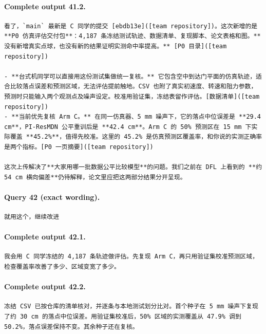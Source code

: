 \documentclass[UTF8,10pt]{ctexart}
\begin{document}
\paragraph{Complete output 41.2.}
\begin{Verbatim}[breaklines=true,breakanywhere=true,fontsize=\scriptsize,frame=single,framesep=2pt]
看了，`main` 最新是 C 同学的提交 [ebdb13e]([team repository])。这次新增的是 **P0 仿真评估交付包**：4,187 条冻结测试轨迹、数据清单、复现脚本、论文表格和图。**没有新增真实点球，也没有新的结果证明实测命中率提高。** [P0 目录]([team repository])

- **台式机同学可以直接用这份测试集做统一复核。** 它包含空中到达门平面的仿真轨迹，适合比较落点误差和预测区域，无法评估提前触地。CSV 也附了真实初速度、转速和阻力参数，预测时只能输入两个观测点及噪声设定。校准用验证集，冻结表留作评估。[数据清单]([team repository])
- **当前优先复核 Arm C。** 在同一仿真器、5 mm 噪声下，它的落点中位误差是 **29.4 cm**，PI-ResMDN 公平重训后是 **42.4 cm**。Arm C 的 50% 预测区在 15 mm 下实际覆盖 **45.2%**，值得先校准。这里的 45.2% 是仿真预测区覆盖率，和你说的实测正确率是两个指标。[P0 一页摘要]([team repository])

这次上传解决了**大家用哪一批数据公平比较模型**的问题。我们之前在 DFL 上看到的 **约 54 cm 横向偏差**仍待解释，论文里应把这两部分结果分开呈现。
\end{Verbatim}

\paragraph{Query 42 (exact wording).}
\begin{Verbatim}[breaklines=true,breakanywhere=true,fontsize=\scriptsize,frame=single,framesep=2pt]
就用这个，继续改进
\end{Verbatim}

\paragraph{Complete output 42.1.}
\begin{Verbatim}[breaklines=true,breakanywhere=true,fontsize=\scriptsize,frame=single,framesep=2pt]
我会用 C 同学冻结的 4,187 条轨迹做评估。先复现 Arm C，再只用验证集校准预测区域，检查覆盖率改善了多少、区域变宽了多少。
\end{Verbatim}

\paragraph{Complete output 42.2.}
\begin{Verbatim}[breaklines=true,breakanywhere=true,fontsize=\scriptsize,frame=single,framesep=2pt]
冻结 CSV 已按仓库的清单核对，并逐条与本地测试划分比对。首个种子在 5 mm 噪声下复现了约 30 cm 的落点中位误差。用验证集校准后，50% 区域的实测覆盖从 47.9% 调到 50.2%，落点误差保持不变。其余种子还在复核。
\end{Verbatim}
\end{document}
